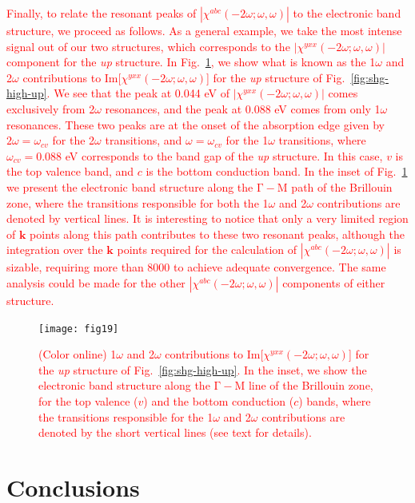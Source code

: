 \documentclass[pss]{wiley2sp} %
\begin{document}
\textcolor{red}{Finally, 
to relate the resonant peaks of 
$|\chi^{abc}(-2\omega;\omega,\omega)|$ 
to the electronic band structure, we proceed as follows.
As a general example,
we take the most intense signal out of our two structures, which
corresponds to the
$|\chi^{yxx}(-2\omega;\omega,\omega)|$ component
for the {\it up} 
 structure.
In Fig.~\ref{fig:bands}, we show
what is known as the 1$\omega$ and 2$\omega$
contributions \cite{andersonPRB15}  to 
Im[$\chi^{yxx}(-2\omega;\omega,\omega)$]   
for the {\it up} structure of Fig.~\ref{fig:shg-high-up}.
We see that the peak at 0.044 eV of
$|\chi^{yxx}(-2\omega;\omega,\omega)|$
comes exclusively from 2$\omega$ resonances,
and the peak at 0.088 eV comes from only 1$\omega$ resonances. 
These two peaks are at the onset of the absorption edge given by 
$2\omega=\omega_{cv}$ for the 2$\omega$ transitions, and 
$\omega=\omega_{cv}$ for the 1$\omega$ transitions, where
$\omega_{cv}=0.088$ eV corresponds to the band gap of the {\it up}
structure.
In this case,
$v$ is  the top valence band, and $c$ is the bottom conduction
band.
In the inset 
of Fig.~\ref{fig:bands}
we present the electronic band structure along the $\mathrm{\Gamma-M}$
path of 
the Brillouin zone, 
where the transitions responsible 
for both the 1$\omega$ and 2$\omega$ contributions are denoted by vertical 
lines. It is interesting to notice that only a very limited region of
$\mathbf{k}$ points  
along this path contributes to these two resonant peaks, although
the integration over   
the $\mathbf{k}$ points required for the calculation of
$|\chi^{abc}(-2\omega;\omega,\omega)|$ \cite{andersonPRB15}
 is sizable,  requiring more
than 8000 to
achieve adequate convergence. 
The same analysis could be made for the other 
$|\chi^{abc}(-2\omega;\omega,\omega)|$ components of either structure.}

\begin{figure}[t]
\texttt{[image: fig19]}
\caption{\textcolor{red}{(Color online) 
1$\omega$ and 2$\omega$ contributions to 
Im[$\chi^{yxx}(-2\omega;\omega,\omega)$] 
for the {\it up} structure of Fig.~\ref{fig:shg-high-up}. In the inset, 
we show the electronic band structure along the $\mathrm{\Gamma-M}$ line of 
the Brillouin zone, for the top valence ($v$) and the bottom
conduction ($c$) bands,
where the transitions responsible 
for the 1$\omega$ and 2$\omega$ contributions are denoted by the short
vertical lines (see text for details).}} 
\label{fig:bands}
\end{figure}

\section{Conclusions}\label{sec:conclusions}
\end{document}
